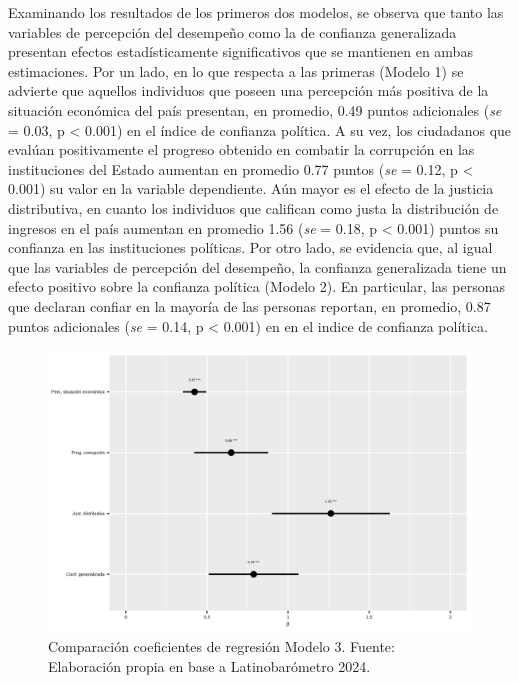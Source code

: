 \documentclass[12pt,twoside]{templates/facsothesis}
\begin{document}
Examinando los resultados de los primeros dos modelos, se observa que tanto las variables de percepción del desempeño como la de confianza generalizada presentan efectos estadísticamente significativos que se mantienen en ambas estimaciones. Por un lado, en lo que respecta a las primeras (Modelo 1) se advierte que aquellos individuos que poseen una percepción más positiva de la situación económica del país presentan, en promedio, 0.49 puntos adicionales (\emph{se} = 0.03, p \textless{} 0.001) en el índice de confianza política. A su vez, los ciudadanos que evalúan positivamente el progreso obtenido en combatir la corrupción en las instituciones del Estado aumentan en promedio 0.77 puntos (\emph{se} = 0.12, p \textless{} 0.001) su valor en la variable dependiente. Aún mayor es el efecto de la justicia distributiva, en cuanto los individuos que califican como justa la distribución de ingresos en el país aumentan en promedio 1.56 (\emph{se} = 0.18, p \textless{} 0.001) puntos su confianza en las instituciones políticas. Por otro lado, se evidencia que, al igual que las variables de percepción del desempeño, la confianza generalizada tiene un efecto positivo sobre la confianza política (Modelo 2). En particular, las personas que declaran confiar en la mayoría de las personas reportan, en promedio, 0.87 puntos adicionales (\emph{se} = 0.14, p \textless{} 0.001) en en el indice de confianza política.

\begin{figure}[!ht]

{\centering \includegraphics[width=1\linewidth,]{IPO/output/graphs/coeficientes} 

}

\caption{Comparación coeficientes de regresión Modelo 3. Fuente: Elaboración propia en base a Latinobarómetro 2024.}\label{fig:grafico-3}
\end{figure}
\end{document}
